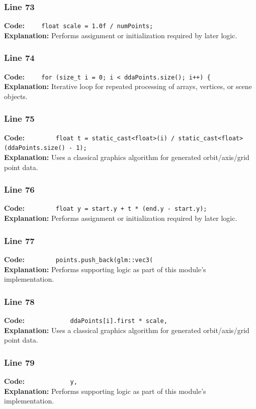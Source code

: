 \documentclass[11pt,a4paper]{article}
\begin{document}
\subsubsection*{Line 73}
\textbf{Code:} \verb|    float scale = 1.0f / numPoints;|\\
\textbf{Explanation:} Performs assignment or initialization required by later logic.

\subsubsection*{Line 74}
\textbf{Code:} \verb|    for (size_t i = 0; i < ddaPoints.size(); i++) {|\\
\textbf{Explanation:} Iterative loop for repeated processing of arrays, vertices, or scene objects.

\subsubsection*{Line 75}
\textbf{Code:} \verb|        float t = static_cast<float>(i) / static_cast<float>(ddaPoints.size() - 1);|\\
\textbf{Explanation:} Uses a classical graphics algorithm for generated orbit/axis/grid point data.

\subsubsection*{Line 76}
\textbf{Code:} \verb|        float y = start.y + t * (end.y - start.y);|\\
\textbf{Explanation:} Performs assignment or initialization required by later logic.

\subsubsection*{Line 77}
\textbf{Code:} \verb|        points.push_back(glm::vec3(|\\
\textbf{Explanation:} Performs supporting logic as part of this module's implementation.

\subsubsection*{Line 78}
\textbf{Code:} \verb|            ddaPoints[i].first * scale,|\\
\textbf{Explanation:} Uses a classical graphics algorithm for generated orbit/axis/grid point data.

\subsubsection*{Line 79}
\textbf{Code:} \verb|            y,|\\
\textbf{Explanation:} Performs supporting logic as part of this module's implementation.
\end{document}
